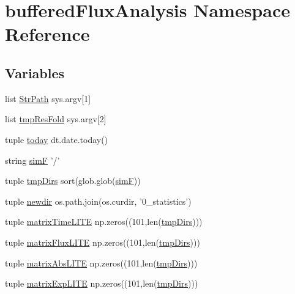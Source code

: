 \hypertarget{namespacebuffered_flux_analysis}{\section{buffered\-Flux\-Analysis Namespace Reference}
\label{namespacebuffered_flux_analysis}
}
\subsection*{Variables}
\begin{DoxyCompactItemize}
\item 
list \hyperlink{namespacebuffered_flux_analysis_a86b649a1e51f1e3384ad432c0de3340b}{Str\-Path} sys.\-argv\mbox{[}1\mbox{]}
\item 
list \hyperlink{namespacebuffered_flux_analysis_a3293821a23ed904d4f68dffd94c609e1}{tmp\-Res\-Fold} sys.\-argv\mbox{[}2\mbox{]}
\item 
tuple \hyperlink{namespacebuffered_flux_analysis_a37cf8287ac5d9f5b83732efe352cf154}{today} dt.\-date.\-today()
\item 
string \hyperlink{namespacebuffered_flux_analysis_a94f9529239340003572ace8de46bee35}{sim\-F} '/'
\item 
tuple \hyperlink{namespacebuffered_flux_analysis_afaa1b171179d99fee6ead2ae14dc8fc6}{tmp\-Dirs} sort(glob.\-glob(\hyperlink{namespacebuffered_flux_analysis_a94f9529239340003572ace8de46bee35}{sim\-F}))
\item 
tuple \hyperlink{namespacebuffered_flux_analysis_a90d7a1a691a7ba3f095a06b940e152c9}{newdir} os.\-path.\-join(os.\-curdir, '0\-\_\-statistics')
\item 
tuple \hyperlink{namespacebuffered_flux_analysis_a620ce4d1c541ead7668e3872c011a35c}{matrix\-Time\-L\-I\-T\-E} np.\-zeros((101,len(\hyperlink{namespacebuffered_flux_analysis_afaa1b171179d99fee6ead2ae14dc8fc6}{tmp\-Dirs})))
\item 
tuple \hyperlink{namespacebuffered_flux_analysis_a160e0d0c0c7cff8f8a141429c1235eb8}{matrix\-Flux\-L\-I\-T\-E} np.\-zeros((101,len(\hyperlink{namespacebuffered_flux_analysis_afaa1b171179d99fee6ead2ae14dc8fc6}{tmp\-Dirs})))
\item 
tuple \hyperlink{namespacebuffered_flux_analysis_a1f521f6f720583fe2e06f9a3127841fb}{matrix\-Abs\-L\-I\-T\-E} np.\-zeros((101,len(\hyperlink{namespacebuffered_flux_analysis_afaa1b171179d99fee6ead2ae14dc8fc6}{tmp\-Dirs})))
\item 
tuple \hyperlink{namespacebuffered_flux_analysis_a75957649a19f5d8fc03e06de4e0e30b4}{matrix\-Exp\-L\-I\-T\-E} np.\-zeros((101,len(\hyperlink{namespacebuffered_flux_analysis_afaa1b171179d99fee6ead2ae14dc8fc6}{tmp\-Dirs})))

\end{DoxyCompactItemize}
